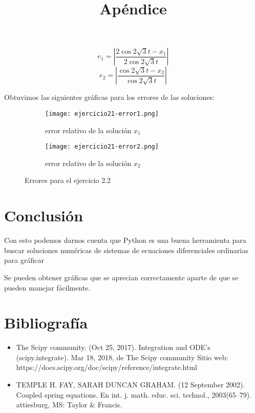 \documentclass{article}
\begin{document}
\[ e_1=\left|\frac{2\cos2\sqrt{3}t-x_1}{2\cos2\sqrt{3}t}\right| \]
\[ e_2=\left|\frac{\cos2\sqrt{3}t-x_2}{\cos2\sqrt{3}t}\right| \]

Obtuvimos las siguientes gráficas para los errores de las soluciones:

\begin{figure}[h!]
	\begin{subfigure}[b]{0.5\linewidth}
    \raggedleft
	\texttt{[image: ejercicio21-error1.png]}
    \caption{error relativo de la solución $x_1$}
	\end{subfigure}
	\begin{subfigure}[b]{0.5\linewidth}
    \raggedright
	\texttt{[image: ejercicio21-error2.png]}
	\caption{error relativo de la solución $x_2$}
    \end{subfigure}
    \caption{Errores para el ejercicio 2.2}
\end{figure}

\section{Conclusión}

Con esto podemos darnos cuenta que Python es una buena herramienta para buscar soluciones numéricas de sistemas de ecuaciones diferenciales ordinarias para gráficar

Se pueden obtener gráficas que se aprecian correctamente aparte de que se pueden manejar fácilmente.
\newpage

\section{Bibliografía}
\begin{itemize}
\item The Scipy community. (Oct 25, 2017). Integration and ODE's (scipy.integrate). Mar 18, 2018, de The Scipy community Sitio web: https://docs.scipy.org/doc/scipy/reference/integrate.html

\item TEMPLE H. FAY, SARAH DUNCAN GRAHAM. (12 September 2002). Coupled spring equations. En int. j. math. educ. sci. technol., 2003(65–79). attiesburg, MS: Taylor \& Francis. 
\end{itemize}

\newpage

\title{\textbf{Apéndice}}
\end{document}
